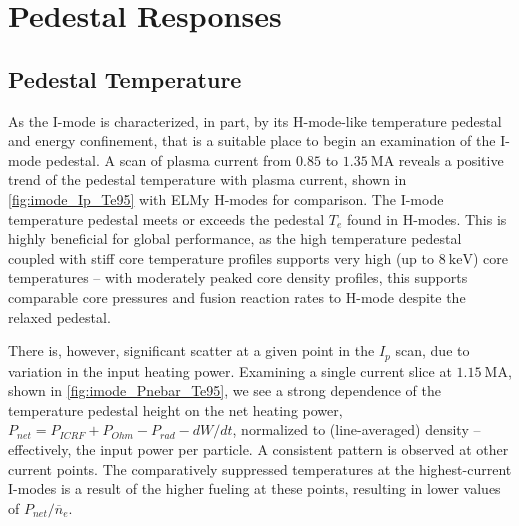\nicesectionending

\section{Pedestal Responses}\label{sec:imode_height}

\noindent{}

\subsection{Pedestal Temperature}\label{subsec:imode_temp}

As the I-mode is characterized, in part, by its H-mode-like temperature pedestal and energy confinement, that is a suitable place to begin an examination of the I-mode pedestal.  A scan of plasma current from $\num{0.85}$ to $\SI{1.35}{\mega\ampere}$ reveals a positive trend of the pedestal temperature with plasma current, shown in \cref{fig:imode_Ip_Te95} with ELMy H-modes for comparison.  The I-mode temperature pedestal meets or exceeds the pedestal $T_e$ found in H-modes.  This is highly beneficial for global performance, as the high temperature pedestal coupled with stiff core temperature profiles supports very high (up to $\SI{8}{\kilo\electronvolt}$) core temperatures -- with moderately peaked core density profiles, this supports comparable core pressures and fusion reaction rates to H-mode despite the relaxed pedestal.

There is, however, significant scatter at a given point in the $I_p$ scan, due to variation in the input heating power.  Examining a single current slice at $\SI{1.15}{\mega\ampere}$, shown in \cref{fig:imode_Pnebar_Te95}, we see a strong dependence of the temperature pedestal height on the net heating power, $P_{net} = P_{ICRF} + P_{Ohm} - P_{rad} - dW/dt$, normalized to (line-averaged) density -- effectively, the input power per particle.  A consistent pattern is observed at other current points.  The comparatively suppressed temperatures at the highest-current I-modes is a result of the higher fueling at these points, resulting in lower values of $P_{net}/\overline{n}_e$.

